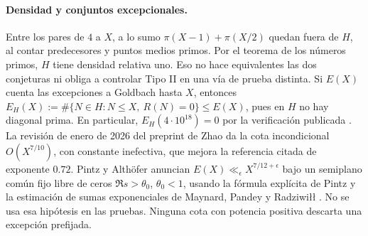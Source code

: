 \documentclass[11pt,a4paper]{article}
\newcommand{\B}[2]{#2}
\newcommand{\B}[2]{#1}
\begin{document}
\paragraph{\B{Density and exceptional sets.}{Densidad y conjuntos excepcionales.}}
\B{Of the even targets from $4$ to $X$, at most $\pi(X-1)+\pi(X/2)$ lie outside $H$, by counting prime predecessors and prime midpoints. Hence $H$ has relative density one by the prime number theorem. This neither makes the two conjectures equivalent nor makes Type II control necessary for a different proof. If $E(X)$ counts Goldbach exceptions through $X$, then $E_H(X):=\#\{N\in H:N\le X,\ R(N)=0\}\le E(X)$, since there is no prime diagonal on $H$. In particular $E_H(4\cdot10^{18})=0$ by the published verification \cite{verify}. Zhao's January 2026 preprint revision \cite{zhao} gives an unconditional $O(X^{7/10})$ bound with an ineffective constant, improving the cited $0.72$ benchmark. Pintz and Althöfer report $E(X)\ll_\epsilon X^{7/12+\epsilon}$ under a common fixed zero-free half-plane $\Re s>\theta_0$, $\theta_0<1$, using Pintz's explicit formula and the exponential-sum estimate of Maynard, Pandey and Radziwiłł \cite{pa,mpr}. We do not use this hypothesis in any proof. No positive power bound rules out a prescribed exception.}{Entre los pares de $4$ a $X$, a lo sumo $\pi(X-1)+\pi(X/2)$ quedan fuera de $H$, al contar predecesores y puntos medios primos. Por el teorema de los números primos, $H$ tiene densidad relativa uno. Eso no hace equivalentes las dos conjeturas ni obliga a controlar Tipo II en una vía de prueba distinta. Si $E(X)$ cuenta las excepciones a Goldbach hasta $X$, entonces $E_H(X):=\#\{N\in H:N\le X,\ R(N)=0\}\le E(X)$, pues en $H$ no hay diagonal prima. En particular, $E_H(4\cdot10^{18})=0$ por la verificación publicada \cite{verify}. La revisión de enero de 2026 del preprint de Zhao \cite{zhao} da la cota incondicional $O(X^{7/10})$, con constante inefectiva, que mejora la referencia citada de exponente $0.72$. Pintz y Althöfer anuncian $E(X)\ll_\epsilon X^{7/12+\epsilon}$ bajo un semiplano común fijo libre de ceros $\Re s>\theta_0$, $\theta_0<1$, usando la fórmula explícita de Pintz y la estimación de sumas exponenciales de Maynard, Pandey y Radziwiłł \cite{pa,mpr}. No se usa esa hipótesis en las pruebas. Ninguna cota con potencia positiva descarta una excepción prefijada.}
\end{document}
